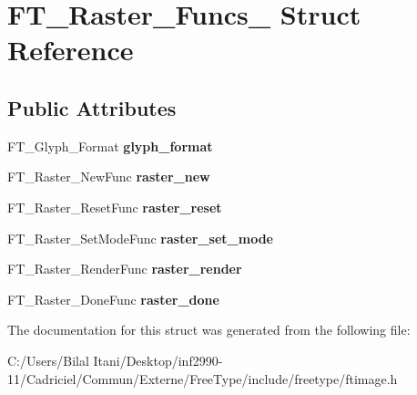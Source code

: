 \hypertarget{struct_f_t___raster___funcs__}{}\section{F\+T\+\_\+\+Raster\+\_\+\+Funcs\+\_\+ Struct Reference}
\label{struct_f_t___raster___funcs__}
\subsection*{Public Attributes}
\begin{DoxyCompactItemize}
\item 
F\+T\+\_\+\+Glyph\+\_\+\+Format {\bfseries glyph\+\_\+format}\hypertarget{struct_f_t___raster___funcs___a741b43afa16f1f1b7f633cebd9f1d6a9}{}\label{struct_f_t___raster___funcs___a741b43afa16f1f1b7f633cebd9f1d6a9}

\item 
F\+T\+\_\+\+Raster\+\_\+\+New\+Func {\bfseries raster\+\_\+new}\hypertarget{struct_f_t___raster___funcs___a31c9df9af6636df8a17a11bcd921b6a4}{}\label{struct_f_t___raster___funcs___a31c9df9af6636df8a17a11bcd921b6a4}

\item 
F\+T\+\_\+\+Raster\+\_\+\+Reset\+Func {\bfseries raster\+\_\+reset}\hypertarget{struct_f_t___raster___funcs___a91e9decd6066090a5f306f33f9815d39}{}\label{struct_f_t___raster___funcs___a91e9decd6066090a5f306f33f9815d39}

\item 
F\+T\+\_\+\+Raster\+\_\+\+Set\+Mode\+Func {\bfseries raster\+\_\+set\+\_\+mode}\hypertarget{struct_f_t___raster___funcs___a3b37c781e54cf933cb60f57f2d45b32c}{}\label{struct_f_t___raster___funcs___a3b37c781e54cf933cb60f57f2d45b32c}

\item 
F\+T\+\_\+\+Raster\+\_\+\+Render\+Func {\bfseries raster\+\_\+render}\hypertarget{struct_f_t___raster___funcs___a7479a3def4522ce2667d6772e7bb96a5}{}\label{struct_f_t___raster___funcs___a7479a3def4522ce2667d6772e7bb96a5}

\item 
F\+T\+\_\+\+Raster\+\_\+\+Done\+Func {\bfseries raster\+\_\+done}\hypertarget{struct_f_t___raster___funcs___aecfd50bb6567d4442c997467cd68c857}{}\label{struct_f_t___raster___funcs___aecfd50bb6567d4442c997467cd68c857}

\end{DoxyCompactItemize}


The documentation for this struct was generated from the following file\+:\begin{DoxyCompactItemize}
\item 
C\+:/\+Users/\+Bilal Itani/\+Desktop/inf2990-\/11/\+Cadriciel/\+Commun/\+Externe/\+Free\+Type/include/freetype/ftimage.\+h\end{DoxyCompactItemize}
